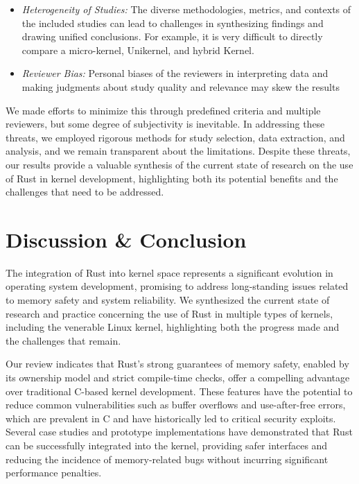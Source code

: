 \documentclass[sigconf]{acmart}
\begin{document}
\begin{itemize}
  \item \textit{Heterogeneity of Studies:} The diverse methodologies, metrics, and contexts of the included studies
    can lead to challenges in synthesizing findings and drawing unified conclusions. For example, it
    is very difficult to directly compare a micro-kernel, Unikernel, and hybrid Kernel.
  \item \textit{Reviewer Bias:} Personal biases of the reviewers in interpreting data and making judgments
    about study quality and relevance may skew the results
\end{itemize}

We made efforts to minimize this through predefined criteria and multiple reviewers, but some
degree of subjectivity is inevitable.  In addressing these threats, we employed rigorous methods for
study selection, data extraction, and analysis, and we remain transparent about the
limitations. 
Despite these threats, our results provide a valuable synthesis of the current
state of research on the use of Rust in kernel development, highlighting both its potential benefits
and the challenges that need to be addressed.

\section{Discussion \& Conclusion}

The integration of Rust into  kernel space represents a significant evolution in operating system
development, promising to address long-standing issues related to memory safety and system
reliability. We synthesized the current state of research and
practice concerning the use of Rust in multiple types of kernels, including the venerable Linux
kernel, highlighting both the progress made and the challenges that remain.

Our review indicates that Rust's strong guarantees of memory safety, enabled by its ownership model
and strict compile-time checks, offer a compelling advantage over traditional C-based kernel
development. These features have the potential to reduce common vulnerabilities such as buffer
overflows and use-after-free errors, which are prevalent in C and have historically led to critical
security exploits. Several case studies and prototype implementations have demonstrated that Rust
can be successfully integrated into the kernel, providing safer interfaces and reducing the
incidence of memory-related bugs without incurring significant performance penalties.
\end{document}
